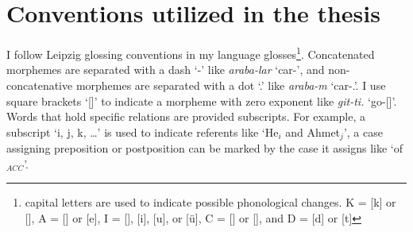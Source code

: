 \section{Conventions utilized in the thesis}

I follow Leipzig glossing conventions \citep{comrie2008leipzig} in my language glosses\footnote{
capital letters are used to indicate possible phonological changes. K = [k] or [\textgamma], A = [\textscripta] or [e], I = [\textturnm], [i], [u], or [ü], C = [\textdyoghlig] or [\textteshlig], and D = [d] or [t]}. Concatenated morphemes are separated with a dash `-' like \textit{araba-lar} `car-{\Pl}', and non-concatenative morphemes are separated with a dot `.' like \textit{araba-m} `car-{\Poss}.{\Fsg}'. I use square brackets `[]' to indicate a morpheme with zero exponent like \textit{git-ti.} `go-{\Pst}[{\Tsg}]'. Words that hold specific relations are provided subscripts. For example, a subscript `i, j, k, \ldots' is used to indicate referents like `He$_i$ and Ahmet$_j$', a case assigning preposition or postposition can be marked by the case it assigns like `of$_{ACC}$'.


